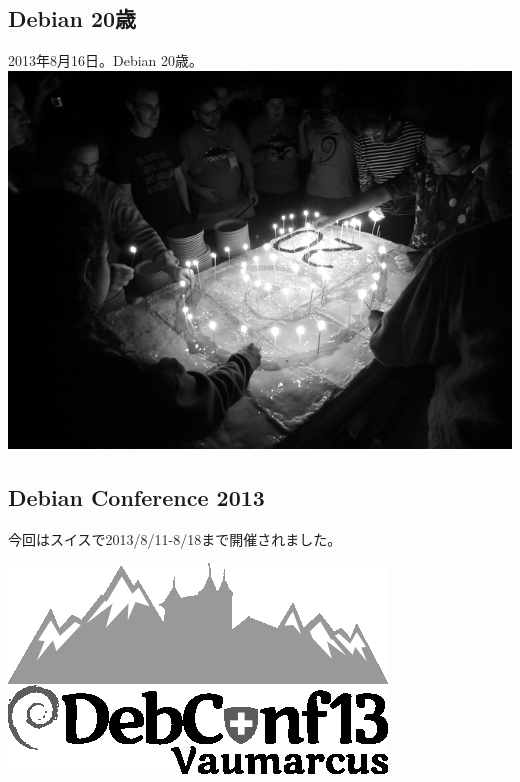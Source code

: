 \documentclass[mingoth,a4paper]{jsarticle}
\begin{document}


\newpage

\subsection{Debian 20歳}
\begin{center}

\Large{2013年8月16日。Debian 20歳。}\\
\includegraphics[width=0.8\hsize]{image201310/debian-20years_mono.png}
\end{center}

\subsection{Debian Conference 2013}

 今回はスイスで2013/8/11-8/18まで開催されました。

\begin{center}
\includegraphics[width=0.8\hsize]{image201310/DebConf13-logo_mono.png}
\end{center}
\end{document}
